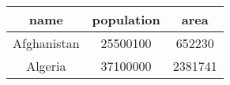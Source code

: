 \begin{tabular}{|c|c|c|}
    \hline
        \textbf{name} & \textbf{population} & \textbf{area} \\ \hline
        Afghanistan & 25500100 & 652230 \\ 
        Algeria & 37100000 & 2381741 \\ \hline
\end{tabular}
